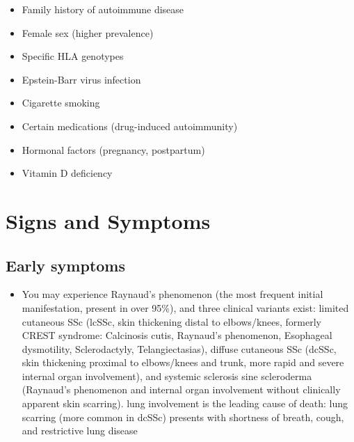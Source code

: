 \begin{itemize}[noitemsep]
  \item Family history of autoimmune disease
  \item Female sex (higher prevalence)
  \item Specific HLA genotypes
  \item Epstein-Barr virus infection
  \item Cigarette smoking
  \item Certain medications (drug-induced autoimmunity)
  \item Hormonal factors (pregnancy, postpartum)
  \item Vitamin D deficiency
\end{itemize}
\section{Signs and Symptoms}

\subsection{Early symptoms}
\begin{itemize}[noitemsep]
  \item You may experience Raynaud's phenomenon (the most frequent initial manifestation, present in over 95\%), and three clinical variants exist: limited cutaneous SSc (lcSSc, skin thickening distal to elbows/knees, formerly CREST syndrome: Calcinosis cutis, Raynaud's phenomenon, Esophageal dysmotility, Sclerodactyly, Telangiectasias), diffuse cutaneous SSc (dcSSc, skin thickening proximal to elbows/knees and trunk, more rapid and severe internal organ involvement), and systemic sclerosis sine scleroderma (Raynaud's phenomenon and internal organ involvement without clinically apparent skin scarring). lung involvement is the leading cause of death: lung scarring (more common in dcSSc) presents with shortness of breath, cough, and restrictive lung disease
\end{itemize}

